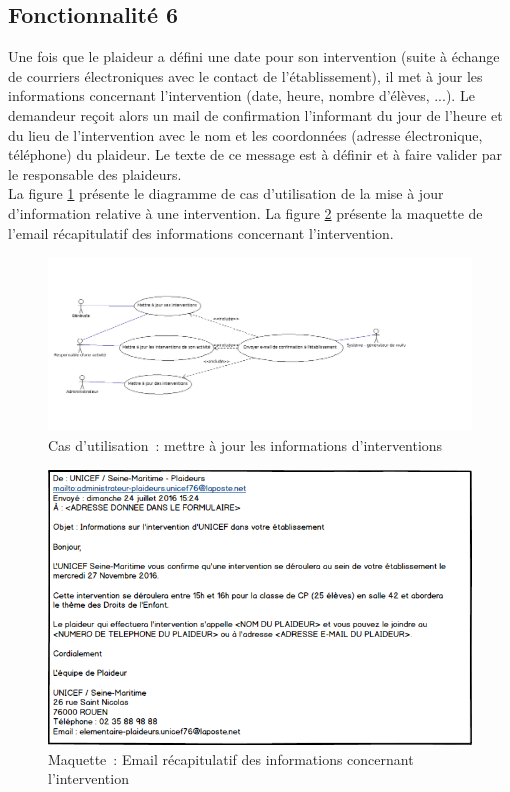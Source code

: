 \subsection{Fonctionnalité 6}
Une fois que le plaideur a défini une date pour son intervention (suite à échange de courriers électroniques avec le contact de l'établissement), il met à jour les informations concernant l'intervention (date, heure, nombre d'élèves, ...). Le demandeur reçoit alors un mail de confirmation l'informant du jour de l'heure et du lieu de l'intervention avec le nom et les coordonnées (adresse électronique, téléphone) du plaideur. Le texte de ce message est à définir et à faire valider par le responsable des plaideurs.
 \\
  La figure \ref{mettreAJourInterventions} présente le diagramme de cas d'utilisation de la mise à jour d'information relative à une intervention. La figure \ref{courrielRecapitulatifIntervention} présente la maquette de l'email récapitulatif des informations concernant l'intervention. 
 
\begin{figure}[H]
	\centering
	\includegraphics[scale=0.4]{images/casDUtilisation/fonctionnalite6MiseAJourIntervention.png}
	 \caption{Cas d'utilisation~: mettre à jour les informations d'interventions}
	 \label{mettreAJourInterventions}
\end{figure}


\begin{figure}[H]
	\centering
	\includegraphics[scale=0.7]{images/maquettes/fonctionnalite6MailDInformationPourLEtablissement.png}
	\caption{Maquette~: Email récapitulatif des informations concernant l'intervention}
	\label{courrielRecapitulatifIntervention}
\end{figure}
